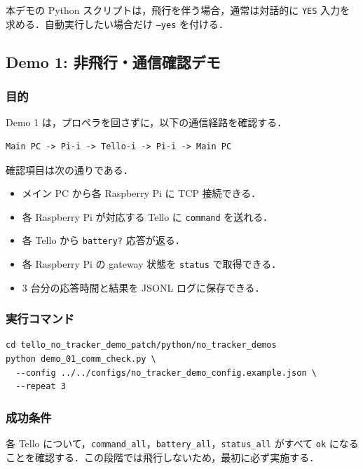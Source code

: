 本デモの Python スクリプトは，飛行を伴う場合，通常は対話的に \texttt{YES} 入力を求める．自動実行したい場合だけ \texttt{--yes} を付ける．

\subsection{Demo 1: 非飛行・通信確認デモ}

\subsubsection{目的}

Demo 1 は，プロペラを回さずに，以下の通信経路を確認する．

\begin{lstlisting}
Main PC -> Pi-i -> Tello-i -> Pi-i -> Main PC
\end{lstlisting}

確認項目は次の通りである．

\begin{itemize}
  \item メイン PC から各 Raspberry Pi に TCP 接続できる．
  \item 各 Raspberry Pi が対応する Tello に \texttt{command} を送れる．
  \item 各 Tello から \texttt{battery?} 応答が返る．
  \item 各 Raspberry Pi の gateway 状態を \texttt{status} で取得できる．
  \item 3 台分の応答時間と結果を JSONL ログに保存できる．
\end{itemize}

\subsubsection{実行コマンド}

\begin{lstlisting}
cd tello_no_tracker_demo_patch/python/no_tracker_demos
python demo_01_comm_check.py \
  --config ../../configs/no_tracker_demo_config.example.json \
  --repeat 3
\end{lstlisting}

\subsubsection{成功条件}

各 Tello について，\texttt{command\_all}，\texttt{battery\_all}，\texttt{status\_all} がすべて \texttt{ok} になることを確認する．この段階では飛行しないため，最初に必ず実施する．

